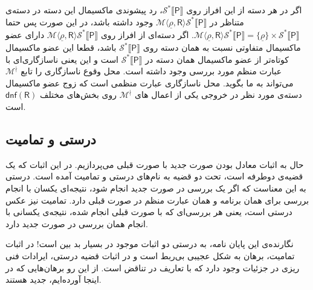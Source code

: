 اگر در هر دسته از این افراز روی 
$\mathcal{S}^* \llbracket \mathsf{P} \rrbracket$،
رد پیشوندی ماکسیمال این دسته در دسته‌ی متناظر در
$\mathcal{M} \langle \underline{\rho}, \mathsf{R} \rangle \mathcal{S}^* \llbracket \mathsf{P} \rrbracket$
 وجود داشته باشد، در این صورت پس حتما \break
$\mathcal{M} \langle \underline{\rho}, \mathsf{R} \rangle \mathcal{S}^* \llbracket \mathsf{P} \rrbracket =\{\underline{\rho}\} \times \mathcal{S}^* \llbracket \mathsf{P} \rrbracket$.
اگر دسته‌ای از افراز روی 
$\mathcal{M} \langle \underline{\rho}, \mathsf{R} \rangle \mathcal{S}^* \llbracket \mathsf{P} \rrbracket$
دارای عضو ماکسیمال متفاوتی نسبت به همان دسته روی 
$\mathcal{S}^* \llbracket \mathsf{P} \rrbracket$
باشد، قطعا این عضو ماکسیمال کوتاه‌تر از عضو ماکسیمال همان دسته در 
$\mathcal{S}^* \llbracket \mathsf{P} \rrbracket$
است و این یعنی ناسازگاری‌ای با عبارت منظم مورد بررسی وجود داشته است. محل وقوع ناسازگاری را تابع  
$\mathcal{M}^\nmid$
می‌تواند به ما بگوید. محل ناسازگاری عبارت منظمی است که زوج عضو ماکسیمال دسته‌ی مورد نظر در خروجی یکی از اعمال های 
$\mathcal{M}^\nmid$
روی بخش‌های مختلف 
$\mathsf{dnf(R)}$
است. 




\subsection{درستی و تمامیت}
حال به اثبات معادل بودن صورت جدید با صورت قبلی می‌پردازیم. در \cite{calcul} این اثبات که یک قضیه‌ی دوطرفه است، تحت دو قضیه به نام‌های درستی و تمامیت آمده است. درستی به این معناست که اگر یک بررسی در صورت جدید انجام شود، نتیجه‌ای یکسان با انجام بررسی برای همان برنامه و همان عبارت منظم در صورت قبلی دارد. تمامیت نیز عکس درستی است، یعنی هر بررسی‌ای که با صورت قبلی انجام شده، نتیجه‌ی یکسانی با انجام همان بررسی در صورت جدید دارد.

نگارنده‌ی این پایان نامه، به درستی دو اثبات موجود در \cite{calcul} بسیار بد بین است! در اثبات تمامیت، برهان به شکل عجیبی بی‌ربط است و در اثبات قضیه درستی، ایرادات فنی ریزی در جزئیات وجود دارد که با تعاریف در تناقض است. از این رو برهان‌هایی که در اینجا آورده‌ایم، جدید هستند.

